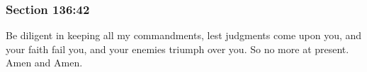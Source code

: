 	\subsubsection{Section 136:42} %
		\label{DC136-42}

		Be diligent in keeping all my commandments, lest judgments come upon you, and your faith fail you, and your enemies triumph over you.  So no more at present.  Amen and Amen.


